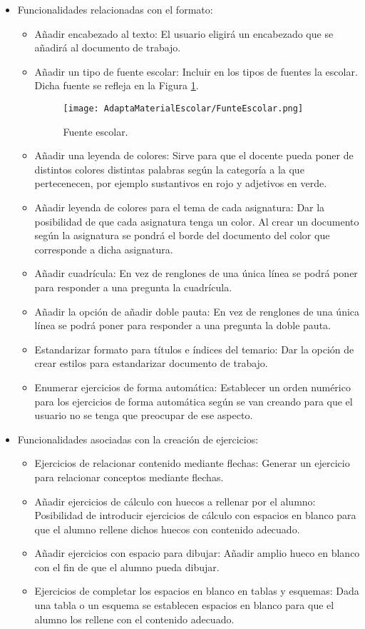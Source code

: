 \begin{itemize}
  \item Funcionalidades relacionadas con el formato: 
  \begin{itemize}
    \item Añadir encabezado al texto: El usuario eligirá un encabezado que se añadirá al documento de trabajo.
    \item Añadir un tipo de fuente escolar: Incluir en los tipos de fuentes la escolar. Dicha fuente se refleja en la Figura \ref{escolar}.
    \begin{figure}[ht!]
      \centering
      \texttt{[image: AdaptaMaterialEscolar/FunteEscolar.png]}
      \caption{Fuente escolar.}
      \label{escolar}
  \end{figure}
    \item Añadir una leyenda de colores: Sirve para que el docente pueda poner de distintos colores distintas palabras según la categoría a la que pertecenecen, por ejemplo sustantivos en rojo y adjetivos en verde.
    \item Añadir leyenda de colores para el tema de cada asignatura: Dar la posibilidad de que cada asignatura tenga un color. Al crear un documento según la asignatura se pondrá el borde del documento del color que corresponde a dicha asignatura.
    \item Añadir cuadrícula: En vez de renglones de una única línea se podrá poner para responder a una pregunta la cuadrícula.
    \item Añadir la opción de añadir doble pauta: En vez de renglones de una única línea se podrá poner para responder a una pregunta la doble pauta.
    \item Estandarizar formato para títulos e índices del temario: Dar la opción de crear estilos para estandarizar documento de trabajo.
    \item Enumerar ejercicios de forma automática: Establecer un orden numérico para los ejercicios de forma automática según se van creando para que el usuario no se tenga que preocupar de ese aspecto.
  \end{itemize}

  \item Funcionalidades asociadas con la creación de ejercicios:
  \begin{itemize}
    \item Ejercicios de relacionar contenido mediante flechas: Generar un ejercicio para relacionar conceptos mediante flechas.
    \item Añadir ejercicios de cálculo con huecos a rellenar por el alumno: Posibilidad de introducir ejercicios de cálculo con espacios en blanco para que el alumno rellene dichos huecos con contenido adecuado.
    \item Añadir ejercicios con espacio para dibujar: Añadir amplio hueco en blanco con el fin de que el alumno pueda dibujar.
    \item Ejercicios de completar los espacios en blanco en tablas y esquemas: Dada una tabla o un esquema se establecen espacios en blanco para que el alumno los rellene con el contenido adecuado.
  \end{itemize}


\end{itemize}
